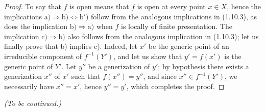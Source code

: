 \begin{proof}
To say that $f$ is open means that $f$ is open at every point $x\in X$,
hence the implications
$\mathrm{a)}\Rightarrow\mathrm{b)}\Leftrightarrow\mathrm{b')}$ follow from
the analogous implications in (1.10.3), as does the implication
$\mathrm{b)}\Rightarrow\mathrm{a)}$ when $f$ is locally of finite
presentation. The implication $\mathrm{c)}\Rightarrow\mathrm{b)}$ also
follows from the analogous implication in (1.10.3); let us finally prove that
b) implies c). Indeed, let $x'$ be the generic point of an irreducible
component of $f^{-1}(Y')$, and let us show that $y'=f(x')$ is the generic
point of $Y'$. Let $y''$ be a generization of $y'$; by hypothesis there
exists a generization $x''$ of $x'$ such that $f(x'')=y''$, and since
$x''\in f^{-1}(Y')$, we necessarily have $x''=x'$, hence $y''=y'$, which
completes the proof.
\end{proof}

\begin{center}
\emph{(To be continued.)}
\end{center}

\clearpage
{}
{}
